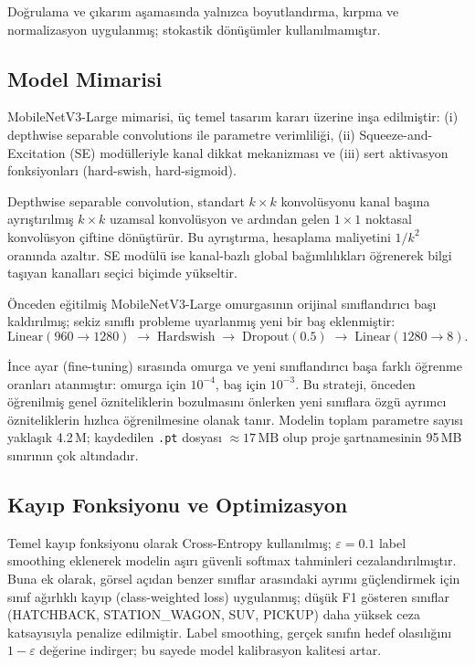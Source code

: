 \documentclass[conference]{IEEEtran}
\begin{document}
Doğrulama ve çıkarım aşamasında yalnızca boyutlandırma, kırpma ve
normalizasyon uygulanmış; stokastik dönüşümler kullanılmamıştır.

\subsection{Model Mimarisi}

MobileNetV3-Large \cite{mobilenetv3} mimarisi, üç temel tasarım kararı
üzerine inşa edilmiştir: (i) depthwise separable convolutions ile
parametre verimliliği, (ii) Squeeze-and-Excitation (SE) \cite{senet}
modülleriyle kanal dikkat mekanizması ve (iii) sert aktivasyon
fonksiyonları (hard-swish, hard-sigmoid).

Depthwise separable convolution, standart $k\times k$ konvolüsyonu
kanal başına ayrıştırılmış $k\times k$ uzamsal konvolüsyon ve ardından
gelen $1\times1$ noktasal konvolüsyon çiftine dönüştürür. Bu
ayrıştırma, hesaplama maliyetini $1/k^2$ oranında azaltır. SE modülü
ise kanal-bazlı global bağımlılıkları öğrenerek bilgi taşıyan kanalları
seçici biçimde yükseltir.

Önceden eğitilmiş MobileNetV3-Large omurgasının orijinal sınıflandırıcı
başı kaldırılmış; sekiz sınıflı probleme uyarlanmış yeni bir baş
eklenmiştir:
\begin{equation}
\mathrm{Linear}(960\!\to\!1280)\;\to\;\mathrm{Hardswish}\;\to\;
\mathrm{Dropout}(0.5)\;\to\;\mathrm{Linear}(1280\!\to\!8).
\end{equation}

İnce ayar (fine-tuning) sırasında omurga ve yeni sınıflandırıcı başa
farklı öğrenme oranları atanmıştır: omurga için $10^{-4}$, baş için
$10^{-3}$. Bu strateji, önceden öğrenilmiş genel özniteliklerin
bozulmasını önlerken yeni sınıflara özgü ayrımcı özniteliklerin
hızlıca öğrenilmesine olanak tanır. Modelin toplam parametre sayısı
yaklaşık 4.2\,M; kaydedilen \texttt{.pt} dosyası $\approx17\,\text{MB}$
olup proje şartnamesinin 95\,MB sınırının çok altındadır.

\subsection{Kayıp Fonksiyonu ve Optimizasyon}

Temel kayıp fonksiyonu olarak Cross-Entropy kullanılmış; $\varepsilon=0.1$
label smoothing eklenerek modelin aşırı güvenli softmax tahminleri
cezalandırılmıştır. Buna ek olarak, görsel açıdan benzer sınıflar
arasındaki ayrımı güçlendirmek için sınıf ağırlıklı kayıp
(class-weighted loss) uygulanmış; düşük F1 gösteren sınıflar
(HATCHBACK, STATION\_WAGON, SUV, PICKUP) daha yüksek ceza katsayısıyla
penalize edilmiştir. Label smoothing, gerçek sınıfın hedef olasılığını
$1-\varepsilon$ değerine indirger; bu sayede model kalibrasyon kalitesi
artar.
\end{document}
